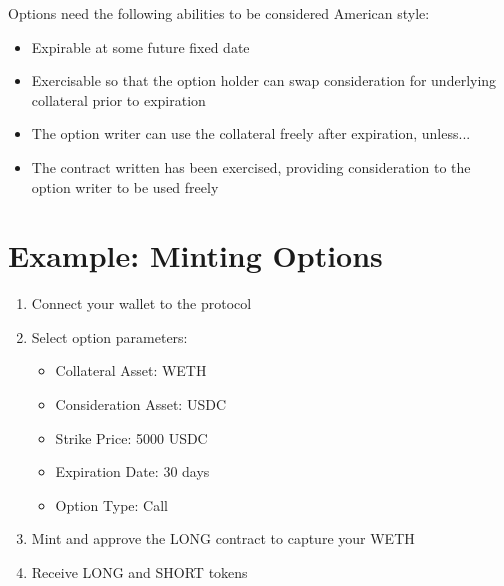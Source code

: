 Options need the following abilities to be considered American style:
\begin{itemize}
  \setlength{\itemsep}{0pt}
  \setlength{\parskip}{0pt}
  \item Expirable at some future fixed date
  \item Exercisable so that the option holder can swap consideration for underlying collateral prior to expiration
  \item The option writer can use the collateral freely after expiration, unless...
  \item The contract written has been exercised, providing consideration to the option writer to be used freely
\end{itemize}

  \section{Example: Minting Options}

  \begin{enumerate}
  \item
    Connect your wallet to the protocol
  \item
    Select option parameters:
    \begin{itemize}
    \item
      Collateral Asset: WETH
    \item
      Consideration Asset: USDC
    \item
      Strike Price: 5000 USDC
    \item
      Expiration Date: 30 days
    \item
      Option Type: Call
    \end{itemize}
  \item
    Mint and approve the LONG contract to capture your WETH
  \item
    Receive LONG and SHORT tokens
  \end{enumerate}
  


